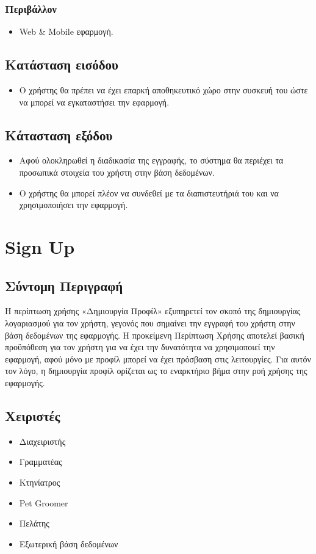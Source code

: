 \documentclass[12pt,a4paper,twoside]{book}
\begin{document}
\subsubsection{Περιβάλλον}
\begin{itemize}
  \item Web \& Mobile εφαρμογή.
\end{itemize}

\subsection{Κατάσταση εισόδου} %
\begin{itemize}
  \item Ο χρήστης θα πρέπει να έχει επαρκή αποθηκευτικό χώρο στην συσκευή του ώστε να μπορεί να εγκαταστήσει την εφαρμογή.%
\end{itemize}

\subsection{Κάτασταση εξόδου} %
\begin{itemize}
  \item Αφού ολοκληρωθεί η διαδικασία της εγγραφής, το σύστημα θα περιέχει τα προσωπικά στοιχεία του χρήστη στην βάση δεδομένων.%
  \item Ο χρήστης θα μπορεί πλέον να συνδεθεί με τα διαπιστευτήριά του και να χρησιμοποιήσει την εφαρμογή. %
\end{itemize}
\section{Sign Up}

\subsection{Σύντομη Περιγραφή}
Η περίπτωση χρήσης «Δημιουργία Προφίλ» εξυπηρετεί τον σκοπό της δημιουργίας λογαριασμού για τον χρήστη, γεγονός που σημαίνει την εγγραφή του χρήστη στην βάση δεδομένων της εφαρμογής. Η προκείμενη Περίπτωση Χρήσης αποτελεί βασική προϋπόθεση για τον χρήστη για να έχει την δυνατότητα να χρησιμοποιεί την εφαρμογή, αφού μόνο με προφίλ μπορεί να έχει πρόσβαση στις λειτουργίες. Για αυτόν τον λόγο, η δημιουργία προφίλ ορίζεται ως το εναρκτήριο βήμα στην ροή χρήσης της εφαρμογής. %

\subsection{Χειριστές}
\begin{itemize}
  \item Διαχειριστής
  \item Γραμματέας
  \item Κτηνίατρος
  \item Pet Groomer
  \item Πελάτης
  \item Εξωτερική βάση δεδομένων %
\end{itemize}
\end{document}
